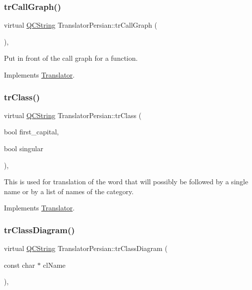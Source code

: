 \subsubsection{\texorpdfstring{trCallGraph()}{trCallGraph()}}
{\footnotesize\ttfamily virtual \mbox{\hyperlink{class_q_c_string}{Q\+C\+String}} Translator\+Persian\+::tr\+Call\+Graph (\begin{DoxyParamCaption}{ }\end{DoxyParamCaption})\hspace{0.3cm}{\ttfamily [inline]}, {\ttfamily [virtual]}}

Put in front of the call graph for a function. 

Implements \mbox{\hyperlink{class_translator}{Translator}}.

\mbox{\label{class_translator_persian_aca05419884ed135f61766579a00bf85c}} 
\subsubsection{\texorpdfstring{trClass()}{trClass()}}
{\footnotesize\ttfamily virtual \mbox{\hyperlink{class_q_c_string}{Q\+C\+String}} Translator\+Persian\+::tr\+Class (\begin{DoxyParamCaption}\item[{bool}]{first\+\_\+capital,  }\item[{bool}]{singular }\end{DoxyParamCaption})\hspace{0.3cm}{\ttfamily [inline]}, {\ttfamily [virtual]}}

This is used for translation of the word that will possibly be followed by a single name or by a list of names of the category. 

Implements \mbox{\hyperlink{class_translator}{Translator}}.

\mbox{\label{class_translator_persian_a377a40fea9c974cd73d053226f866fb4}} 
\subsubsection{\texorpdfstring{trClassDiagram()}{trClassDiagram()}}
{\footnotesize\ttfamily virtual \mbox{\hyperlink{class_q_c_string}{Q\+C\+String}} Translator\+Persian\+::tr\+Class\+Diagram (\begin{DoxyParamCaption}\item[{const char $\ast$}]{cl\+Name }\end{DoxyParamCaption})\hspace{0.3cm}{\ttfamily [inline]}, {\ttfamily [virtual]}}


